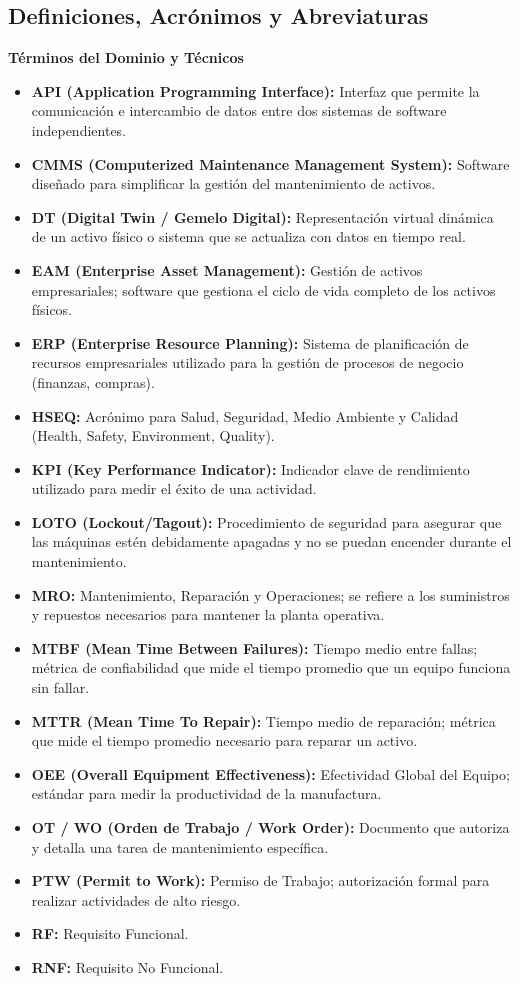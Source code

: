 \subsection{Definiciones, Acrónimos y Abreviaturas}
\textbf{Términos del Dominio y Técnicos}
\begin{itemize}
    \item \textbf{API (Application Programming Interface):} Interfaz que permite la comunicación e intercambio de datos entre dos sistemas de software independientes.
    \item \textbf{CMMS (Computerized Maintenance Management System):} Software diseñado para simplificar la gestión del mantenimiento de activos.
    \item \textbf{DT (Digital Twin / Gemelo Digital):} Representación virtual dinámica de un activo físico o sistema que se actualiza con datos en tiempo real.
    \item \textbf{EAM (Enterprise Asset Management):} Gestión de activos empresariales; software que gestiona el ciclo de vida completo de los activos físicos.
    \item \textbf{ERP (Enterprise Resource Planning):} Sistema de planificación de recursos empresariales utilizado para la gestión de procesos de negocio (finanzas, compras).
    \item \textbf{HSEQ:} Acrónimo para Salud, Seguridad, Medio Ambiente y Calidad (Health, Safety, Environment, Quality).
    \item \textbf{KPI (Key Performance Indicator):} Indicador clave de rendimiento utilizado para medir el éxito de una actividad.
    \item \textbf{LOTO (Lockout/Tagout):} Procedimiento de seguridad para asegurar que las máquinas estén debidamente apagadas y no se puedan encender durante el mantenimiento.
    \item \textbf{MRO:} Mantenimiento, Reparación y Operaciones; se refiere a los suministros y repuestos necesarios para mantener la planta operativa.
    \item \textbf{MTBF (Mean Time Between Failures):} Tiempo medio entre fallas; métrica de confiabilidad que mide el tiempo promedio que un equipo funciona sin fallar.
    \item \textbf{MTTR (Mean Time To Repair):} Tiempo medio de reparación; métrica que mide el tiempo promedio necesario para reparar un activo.
    \item \textbf{OEE (Overall Equipment Effectiveness):} Efectividad Global del Equipo; estándar para medir la productividad de la manufactura.
    \item \textbf{OT / WO (Orden de Trabajo / Work Order):} Documento que autoriza y detalla una tarea de mantenimiento específica.
    \item \textbf{PTW (Permit to Work):} Permiso de Trabajo; autorización formal para realizar actividades de alto riesgo.
    \item \textbf{RF:} Requisito Funcional.
    \item \textbf{RNF:} Requisito No Funcional.
\end{itemize}

